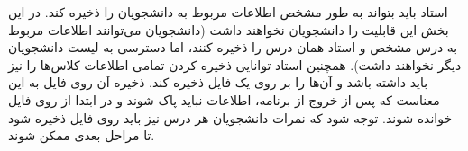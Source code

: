 استاد باید بتواند به طور مشخص اطلاعات مربوط به دانشجویان را ذخیره کند.  
در این بخش این قابلیت را دانشجویان نخواهند داشت (دانشجویان می‌توانند اطلاعات مربوط به درس مشخص و استاد همان درس را ذخیره کنند، اما دسترسی به لیست دانشجویان دیگر نخواهند داشت).  
همچنین استاد توانایی ذخیره کردن تمامی اطلاعات کلاس‌ها را نیز باید داشته باشد و آن‌ها را بر روی یک فایل ذخیره کند. ذخیره آن روی فایل به این معناست که پس از خروج از برنامه، اطلاعات نباید پاک شوند و در ابتدا از روی فایل خوانده شوند. توجه شود که نمرات دانشجویان هر درس نیز باید روی فایل ذخیره شود تا مراحل بعدی ممکن شوند.